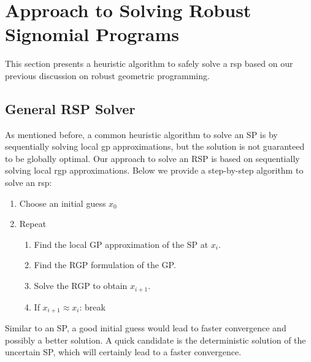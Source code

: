 \section{Approach to Solving Robust Signomial Programs}

This section presents a heuristic algorithm to safely solve a \gls{rsp}
based on our previous discussion on robust geometric programming.

\subsection{General RSP Solver}
As mentioned before, a common heuristic algorithm to solve an SP is
by sequentially solving local \gls{gp} approximations, but the solution is not guaranteed
to be globally optimal. Our approach to solve an RSP is based on sequentially solving
local \gls{rgp} approximations. Below we provide a step-by-step algorithm to solve an \gls{rsp}:

\begin{enumerate}
    \item Choose an initial guess $x_0$
    \item Repeat
    \begin{enumerate}
        \item Find the local GP approximation of the SP at $x_i$.
        \item Find the RGP formulation of the GP.
        \item Solve the RGP to obtain $x_{i+1}$.
        \item If $x_{i+1} \approx x_{i}$: break
    \end{enumerate}
\end{enumerate}

Similar to an SP, a good initial guess would lead to faster convergence and possibly a better solution.
A quick candidate is the deterministic solution of the uncertain SP, which will certainly lead to a faster convergence.

